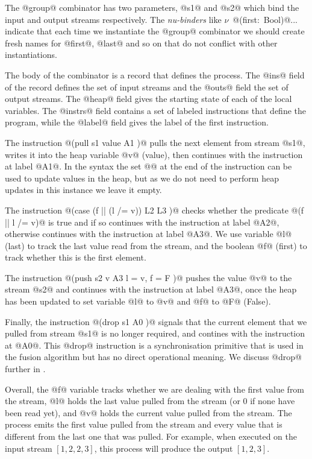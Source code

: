 The @group@ combinator has two parameters, @s1@ and @s2@ which bind the input and output streams respectively. The \emph{nu-binders} like \mbox{$\nu$ @(first: Bool)@...} indicate that each time we instantiate the @group@ combinator we should create fresh names for @first@, @last@ and so on that do not conflict with other instantiations. 

The body of the combinator is a record that defines the process. The @ins@ field of the record defines the set of input streams and the @outs@ field the set of output streams. The @heap@ field gives the starting state of each of the local variables. The @instrs@ field contains a set of labeled instructions that define the program, while the @label@ field gives the label of the first instruction. 

The instruction @(pull s1 value A1 {})@ pulls the next element from stream @s1@, writes it into the heap variable @v@ (value), then continues with the instruction at label @A1@. In the syntax the set @{}@ at the end of the instruction can be used to update values in the heap, but as we do not need to perform heap updates in this instance we leave it empty. 

The instruction @(case (f || (l /= v)) L2 {} L3 {})@ checks whether the predicate @(f || l /= v)@ is true and if so continues with the instruction at label @A2@, otherwise continues with the instruction at label @A3@. We use variable @l@ (last) to track the last value read from the stream, and the boolean @f@ (first) to track whether this is the first element.

The instruction @(push s2 v A3 { l = v, f = F })@ pushes the value @v@ to the stream @s2@ and continues with the instruction at label @A3@, once the heap has been updated to set variable @l@ to @v@ and @f@ to @F@ (False). 

Finally, the instruction @(drop s1 A0 {})@ signals that the current element that we pulled from stream @s1@ is no longer required, and contines with the instruction at @A0@. This @drop@ instruction is a synchronisation primitive that is used in the fusion algorithm but has no direct operational meaning. We discuss @drop@ further in . 

Overall, the @f@ variable tracks whether we are dealing with the first value from the stream, @l@ holds the last value pulled from the stream (or 0 if none have been read yet), and @v@ holds the current value pulled from the stream. The process emits the first value pulled from the stream and every value that is different from the last one that was pulled. For example, when executed on the input stream $[1, 2, 2, 3]$, this process will produce the output $[1, 2, 3]$.

